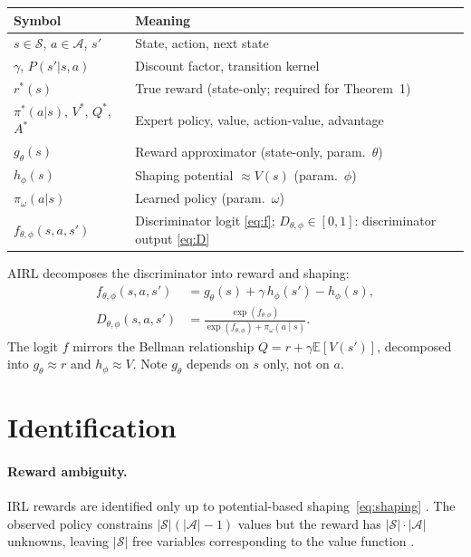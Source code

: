 \documentclass[11pt]{article}
\newcommand{\E}{\mathbb{E}}
\newcommand{\calA}{\mathcal{A}}
\newcommand{\calS}{\mathcal{S}}
\begin{document}
\begin{table}[h!]
\centering\small
\begin{tabular}{ll}
\toprule
Symbol & Meaning \\
\midrule
$s \in \calS$, $a \in \calA$, $s'$ & State, action, next state \\
$\gamma$, $P(s'|s,a)$ & Discount factor, transition kernel \\
$r^*(s)$ & True reward (state-only; required for Theorem~1) \\
$\pi^*(a|s)$, $V^*$, $Q^*$, $A^*$ & Expert policy, value, action-value, advantage \\
\midrule
$g_\theta(s)$ & Reward approximator (state-only, param.\ $\theta$) \\
$h_\phi(s)$ & Shaping potential $\approx V(s)$ (param.\ $\phi$) \\
$\pi_\omega(a|s)$ & Learned policy (param.\ $\omega$) \\
$f_{\theta,\phi}(s,a,s')$ & Discriminator logit \eqref{eq:f}; \quad $D_{\theta,\phi} \in [0,1]$: discriminator output \eqref{eq:D} \\
\bottomrule
\end{tabular}
\end{table}
\FloatBarrier

AIRL decomposes the discriminator into reward and shaping:
\begin{align}
f_{\theta,\phi}(s,a,s') &= g_\theta(s) + \gamma\, h_\phi(s') - h_\phi(s), \label{eq:f}\\[2pt]
D_{\theta,\phi}(s,a,s') &= \frac{\exp(f_{\theta,\phi})}{\exp(f_{\theta,\phi}) + \pi_\omega(a \mid s)}. \label{eq:D}
\end{align}
The logit $f$ mirrors the Bellman relationship $Q = r + \gamma \E[V(s')]$, decomposed into $g_\theta \approx r$ and $h_\phi \approx V$.
Note $g_\theta$ depends on $s$ only, not on $a$.

\section{Identification}

\paragraph{Reward ambiguity.}
IRL rewards are identified only up to potential-based shaping~\eqref{eq:shaping} \citep{ng1999}.
The observed policy constrains $|\calS|(|\calA|-1)$ values but the reward has $|\calS| \cdot |\calA|$ unknowns, leaving $|\calS|$ free variables corresponding to the value function \citep{cao2021}.
\end{document}
